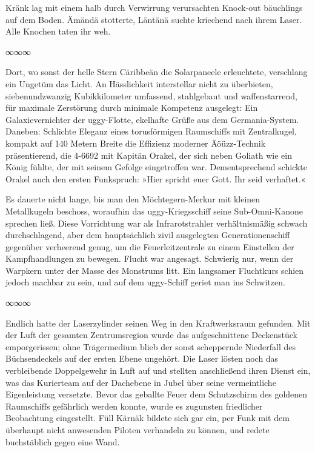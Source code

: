 Kränk lag mit einem halb durch Verwirrung verursachten Knock-out bäuchlings auf dem Boden. Ämändä stotterte, Läntänä suchte kriechend nach ihrem Laser. Alle Knochen taten ihr weh.

\begin{center}
∞∞∞
\end{center}

Dort, wo sonst der helle Stern Cäribbeän die Solarpaneele erleuchtete, verschlang ein Ungetüm das Licht. An Hässlichkeit interstellar nicht zu überbieten, siebenundzwanzig Kubikkilometer umfassend, stahlgebaut und waffenstarrend, für maximale Zerstörung durch minimale Kompetenz ausgelegt: Ein Galaxievernichter der uggy-Flotte, ekelhafte Grüße aus dem Germania-System. Daneben: Schlichte Eleganz eines torusförmigen Raumschiffs mit Zentralkugel, kompakt auf 140 Metern Breite die Effizienz moderner Äöüzz-Technik präsentierend, die 4-6692 mit Kapitän Orakel, der sich neben Goliath wie ein König fühlte, der mit seinem Gefolge eingetroffen war. Dementsprechend schickte Orakel auch den ersten Funkspruch: »Hier spricht euer Gott. Ihr seid verhaftet.«

Es dauerte nicht lange, bis man den Möchtegern-Merkur mit kleinen Metallkugeln beschoss, woraufhin das uggy-Kriegsschiff seine Sub-Omni-Kanone sprechen ließ. Diese Vorrichtung war als Infrarotstrahler verhältnismäßig schwach durchschlagend, aber dem hauptsächlich zivil ausgelegten Generationenschiff gegenüber verheerend genug, um die Feuerleitzentrale zu einem Einstellen der Kampfhandlungen zu bewegen. Flucht war angesagt. Schwierig nur, wenn der Warpkern unter der Masse des Monstrums litt. Ein langsamer Fluchtkurs schien jedoch machbar zu sein, und auf dem uggy-Schiff geriet man ins Schwitzen.

\begin{center}
∞∞∞
\end{center}

Endlich hatte der Laserzylinder seinen Weg in den Kraftwerksraum gefunden. Mit der Luft der gesamten Zentrumsregion wurde das aufgeschnittene Deckenstück emporgerissen; ohne Trägermedium blieb der sonst scheppernde Niederfall des Büchsendeckels auf der ersten Ebene ungehört. Die Laser lösten noch das verbleibende Doppelgewehr in Luft auf und stellten anschließend ihren Dienst ein, was das Kurierteam auf der Dachebene in Jubel über seine vermeintliche Eigenleistung versetzte. Bevor das geballte Feuer dem Schutzschirm des goldenen Raumschiffs gefährlich werden konnte, wurde es zugunsten friedlicher Beobachtung eingestellt. Füll Kärnäk bildete sich gar ein, per Funk mit dem überhaupt nicht anwesenden Piloten verhandeln zu können, und redete buchstäblich gegen eine Wand.

